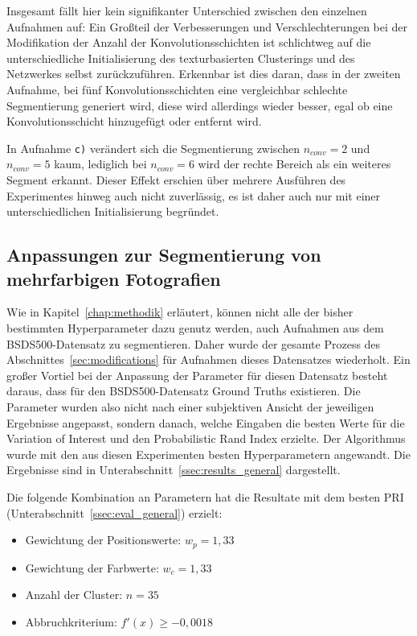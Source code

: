 Insgesamt fällt hier kein signifikanter Unterschied zwischen den einzelnen Aufnahmen auf: Ein Großteil der Verbesserungen und Verschlechterungen bei der Modifikation der Anzahl der Konvolutionsschichten ist schlichtweg auf die unterschiedliche Initialisierung des texturbasierten Clusterings und des Netzwerkes selbst zurückzuführen. Erkennbar ist dies daran, dass in der zweiten Aufnahme, bei fünf Konvolutionsschichten eine vergleichbar schlechte Segmentierung generiert wird, diese wird allerdings wieder besser, egal ob eine Konvolutionsschicht hinzugefügt oder entfernt wird.

In Aufnahme \texttt{c)} verändert sich die Segmentierung zwischen $n_{conv}=2$ und $n_{conv}=5$ kaum, lediglich bei $n_{conv}=6$ wird der rechte Bereich als ein weiteres Segment erkannt. Dieser Effekt erschien über mehrere Ausführen des Experimentes hinweg auch nicht zuverlässig, es ist daher auch nur mit einer unterschiedlichen Initialisierung begründet.

\subsection{Anpassungen zur Segmentierung von mehrfarbigen Fotografien}
\label{ssec:exp_colorpicture_optimization}

Wie in Kapitel~\ref{chap:methodik} erläutert, können nicht alle der bisher bestimmten Hyperparameter dazu genutz werden, auch Aufnahmen aus dem BSDS500-Datensatz zu segmentieren. Daher wurde der gesamte Prozess des Abschnittes~\ref{sec:modifications} für Aufnahmen dieses Datensatzes wiederholt. Ein großer Vortiel bei der Anpassung der Parameter für diesen Datensatz besteht daraus, dass für den BSDS500-Datensatz Ground Truths existieren. Die Parameter wurden also nicht nach einer subjektiven Ansicht der jeweiligen Ergebnisse angepasst, sondern danach, welche Eingaben die besten Werte für die Variation of Interest und den Probabilistic Rand Index erzielte. Der Algorithmus wurde mit den aus diesen Experimenten besten Hyperparametern angewandt. Die Ergebnisse sind in Unterabschnitt~\ref{ssec:results_general} dargestellt.

Die folgende Kombination an Parametern hat die Resultate mit dem besten PRI (\vgl Unterabschnitt~\ref{ssec:eval_general}) erzielt:

\begin{itemize}
	\item{Gewichtung der Positionswerte:} $w_p = 1,33$
	\item{Gewichtung der Farbwerte:} $w_c = 1,33$
	\item{Anzahl der Cluster:} $n = 35$
	\item{Abbruchkriterium:} $f'(x) \geq -0,0018$
\end{itemize}

